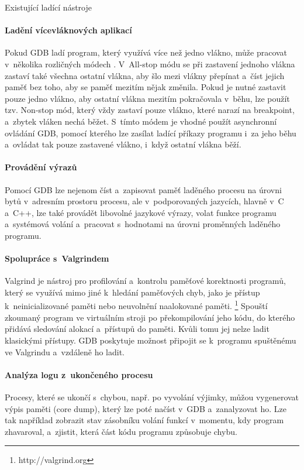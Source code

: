 \documentclass[czech,bachelor,male,python,dept460,hidelinks]{diploma}						%
\begin{document}
\begin{section}{Existující ladící nástroje}
		\paragraph*{Ladění vícevláknových aplikací}
			Pokud GDB ladí program, který využívá více než jedno vlákno, může pracovat v~několika rozličných módech \cite{gdb-multithreading}.
			V~All-stop módu se při zastavení jednoho vlákna zastaví také všechna ostatní vlákna, aby šlo mezi vlákny přepínat a~číst jejich paměť bez toho,
			aby se paměť mezitím nějak změnila. Pokud je nutné zastavit pouze jedno vlákno, aby ostatní vlákna mezitím pokračovala v~běhu, lze použít tzv. Non-stop mód,
			který vždy zastaví pouze vlákno, které narazí na breakpoint, a~zbytek vláken nechá běžet. S~tímto módem je vhodné použít asynchronní ovládání GDB,
			pomocí kterého lze zasílat ladící příkazy programu i~za jeho běhu a~ovládat tak pouze zastavené vlákno, i~když ostatní vlákna běží.
		\paragraph*{Provádění výrazů}
			Pomocí GDB lze nejenom číst a~zapisovat paměť laděného procesu na úrovni bytů v~adresním prostoru procesu, ale v~podporovaných jazycích, hlavně
			v~C a~C++, lze také provádět libovolné jazykové výrazy, volat funkce programu a~systémová volání a~pracovat s~hodnotami na úrovni proměnných
			laděného programu.
		\paragraph*{Spolupráce s~Valgrindem}
			Valgrind je nástroj pro profilování a~kontrolu paměťové korektnosti programů, který se využívá mimo jiné k~hledání paměťových chyb, jako je přístup
			k~neinicializované paměti nebo neuvolnění naalokované paměti. \footnote{http://valgrind.org}
			Spouští zkoumaný program ve virtuálním stroji po překompilování jeho kódu, do kterého přidává sledování alokací a~přístupů do paměti.
			Kvůli tomu jej nelze ladit klasickými přístupy. GDB poskytuje možnost připojit se k~programu spuštěnému ve Valgrindu a~vzdáleně ho ladit.
		\paragraph*{Analýza logu z~ukončeného procesu}
			Procesy, které se ukončí s~chybou, např. po vyvolání výjimky, můžou vygenerovat výpis paměti (core dump), který lze poté načíst v~GDB a~zanalyzovat ho.
			Lze tak například zobrazit stav zásobníku volání funkcí v~momentu, kdy program zhavaroval, a~zjistit, která část kódu programu způsobuje chybu.

\end{section}
\end{document}
